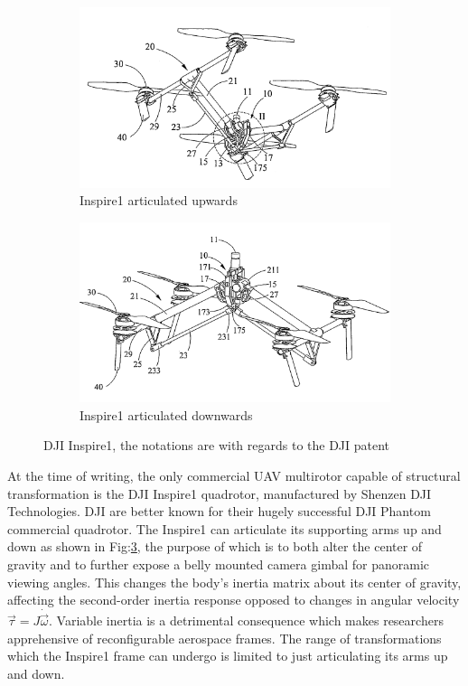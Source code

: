 \begin{figure}[hbtp]
\centering
\begin{subfigure}{.5\textwidth}
\centering
\includegraphics[width=\textwidth]{figs/dji-inspire1}
\caption{Inspire1 articulated upwards}
\label{fig:inspireup}
\end{subfigure}%
\begin{subfigure}{.5\textwidth}
\centering
\includegraphics[width=\textwidth]{figs/dji-inspire2}
\caption{Inspire1 articulated downwards}
\label{fig:inspiredown}
\end{subfigure}
\caption{DJI Inspire1, the notations are with regards to the DJI patent \cite{djinspire}}
\label{fig:inspire1}
\end{figure}
At the time of writing, the only commercial UAV multirotor capable of structural transformation is the DJI Inspire1 quadrotor\cite{inspire}, manufactured by Shenzen DJI Technologies. DJI are better known for their hugely successful DJI Phantom commercial quadrotor\cite{phantom}. The Inspire1 can articulate its supporting arms up and down as shown in Fig:\ref{fig:inspire1}, the purpose of which is to both alter the center of gravity and to further expose a belly mounted camera gimbal for panoramic viewing angles. This changes the body's inertia matrix about its center of gravity, affecting the second-order inertia response opposed to changes in angular velocity $\vec{\tau}=J\dot{\vec{\omega}}$. Variable inertia is a detrimental consequence which makes researchers apprehensive of reconfigurable aerospace frames. The range of transformations which the Inspire1 frame can undergo is limited to just articulating its arms up and down.
